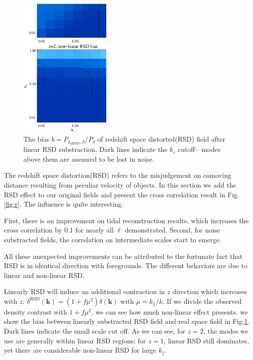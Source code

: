 \begin{figure}[tbp]
\begin{center}
\includegraphics[width=0.4\textwidth]{compare_bias_rsdsub_z1z2.eps}
\end{center}
\vspace{-0.7cm}
\caption{The bias $b=P_{\delta_\mathrm{nlRSD},\delta}/P_{\delta}$ 
of redshift space distorted(RSD) field after linear RSD substraction.
Dark lines indicate the $k_c$ cutoff---modes above them are assumed to be lost in noise.}
\label{fig:bias}
\end{figure}
The redshift space distortion(RSD) refers to the misjudgement on comoving distance 
resulting from peculiar velocity of objects. 
In this section we add the RSD effect to our original fields and 
present the cross correlation result in Fig.\ref{fig:r}. 
The influence is quite interesting. 

First, there is an improvement on tidal reconstruction results, 
which increases the cross correlation by 0.1 for nearly all $\ell$ demonstrated. 
Second, for noise substracted fields, the correlation on intermediate scales start to emerge.  

All these unexpected improvements can be attributed to the fortunate fact 
that RSD is in identical direction with foregrounds. 
The different behaviors are due to linear and non-linear RSD. 

Linearly RSD will induce an additional contraction in $z$ direction 
which increases with $z$.  
$\delta^\mathrm{RSD}(\bm{k})=(1+f\mu^2)\delta(\bm{k})$ 
with $\mu=k_\parallel/k$. 
If we divide the observed density contrast with $1+f\mu^2$, 
we can see how much non-linear effect presents. 
we show the bias between linearly substracted RSD field 
and real space field  
in Fig.\ref{fig:bias}. 
Dark lines indicate the small scale cut off. 
As we can see, 
for $z=2$, the modes we use are generally 
within linear RSD regions; 
for $z=1$, linear RSD still dominates, yet there are considerable non-linear RSD for large $k_\parallel$.  


